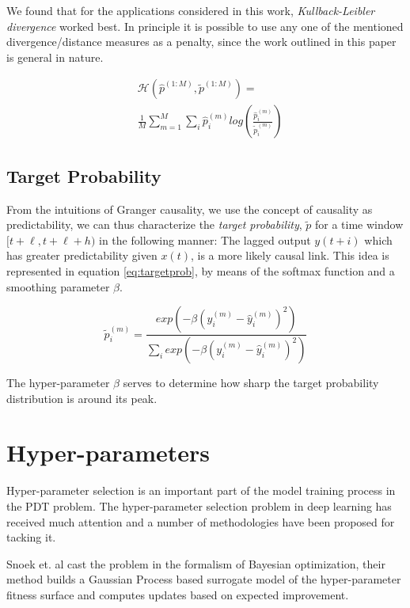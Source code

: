 \documentclass[envcountsect,runningheads]{llncs}
\theoremstyle{etoile}
\begin{document}
We found that for the applications considered in this work, \emph{Kullback-Leibler divergence} 
worked best. In principle it is possible to use any one of the mentioned 
divergence/distance measures as a penalty, since the work outlined in this 
paper is general in nature.

\begin{align}\label{eq:causaldiv}
&\mathcal{H}\left(\hat{p}^{(1:M)}, \tilde{p}^{(1:M)} \right) = \\
&\nonumber \frac{1}{M} \sum_{m = 1}^{M}{\sum_{i}{\hat{p}^{(m)}_{i}log \left (\frac{\hat{p}^{(m)}_i}{\tilde{p}^{(m)}_i} \right)}}
\end{align}


\subsection{Target Probability}\label{sec:targetprob}

From the intuitions of Granger causality, we use the concept of causality as predictability, 
we can thus characterize the \emph{target probability}, $\widetilde{p}$ for a time window 
$[t+\ell, t+\ell+h)$ in the following manner: The lagged output $y(t+i)$ which has greater 
predictability given $x(t)$, is a more likely causal link. This idea is represented in 
equation \ref{eq:targetprob}, by means of the softmax function and a smoothing parameter 
$\beta$.

\begin{equation}\label{eq:targetprob}
\widetilde{p}_{i}^{(m)} = \frac{exp \left(- \beta (y_{i}^{(m)} - \hat{y}_{i}^{(m)})^{2} \right)}
{\sum_{i}{exp \left(- \beta (y_{i}^{(m)} - \hat{y}_{i}^{(m)})^{2} \right)}} 
\end{equation}

The hyper-parameter $\beta$ serves to determine how sharp the target probability distribution is 
around its peak.





\section{Hyper-parameters}

Hyper-parameter selection is an important part of the model training process in the PDT problem. 
The hyper-parameter selection problem in deep learning has received much attention and a number 
of methodologies have been proposed for tacking it. 

Snoek et. al \cite{snoek2012practical} cast the problem in the formalism of Bayesian optimization, their method 
builds a Gaussian Process based surrogate model of the hyper-parameter fitness surface and computes 
updates based on expected improvement. 
\end{document}
